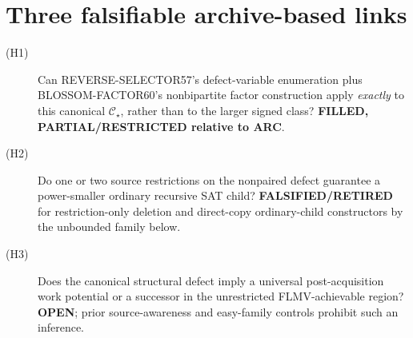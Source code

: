 \documentclass[10pt]{article}
\begin{document}
\section{Three falsifiable archive-based links}
\begin{description}
\item[(H1)] Can REVERSE-SELECTOR57's defect-variable enumeration plus BLOSSOM-FACTOR60's nonbipartite factor construction apply \emph{exactly} to this canonical \(\mathcal C_\star\), rather than to the larger signed class? \textbf{FILLED, PARTIAL/RESTRICTED relative to ARC}.
\item[(H2)] Do one or two source restrictions on the nonpaired defect guarantee a power-smaller ordinary recursive SAT child? \textbf{FALSIFIED/RETIRED} for restriction-only deletion and direct-copy ordinary-child constructors by the unbounded family below.
\item[(H3)] Does the canonical structural defect imply a universal post-acquisition work potential or a successor in the unrestricted FLMV-achievable region? \textbf{OPEN}; prior source-awareness and easy-family controls prohibit such an inference.
\end{description}
\end{document}
